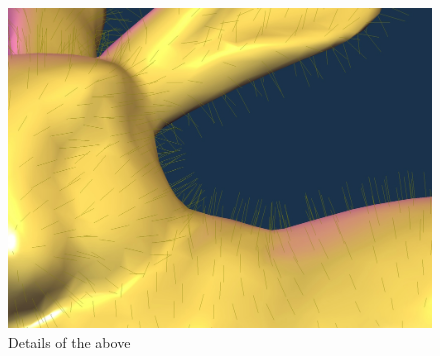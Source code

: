 \documentclass[acmtog]{acmart}
\begin{document}
\begin{figure}[H]
	\centering
	\includegraphics[scale=0.2]{pictures/fur-details.jpg}
	\caption{Details of the above}
\end{figure}
\end{document}
